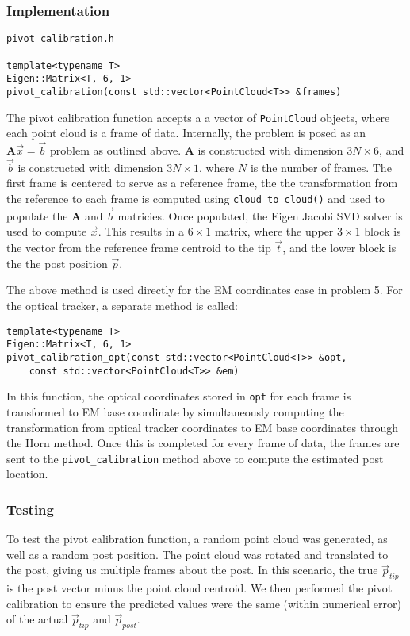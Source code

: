 \documentclass[letterpaper, 11pt]{report}
\newcommand{\mat}[1]{\mathbf{#1}}
\begin{document}
 \subsubsection{Implementation}
 \begin{verbatim}
pivot_calibration.h

template<typename T>
Eigen::Matrix<T, 6, 1>
pivot_calibration(const std::vector<PointCloud<T>> &frames)
 \end{verbatim}
 The pivot calibration function accepts a a vector of \texttt{PointCloud} objects, where each point cloud is a frame of data. Internally, the problem is posed as an $\mat{A}\vec x= \vec b$ problem as outlined above. $\mat A$ is constructed with dimension $3N \times 6$, and $\vec b$ is constructed with dimension $3N \times 1$, where $N$ is the number of frames. The first frame is centered to serve as a reference frame, the the transformation from the reference to each frame is computed using \texttt{cloud\_to\_cloud()} and used to populate the $\mat A$ and $\vec b$ matricies. Once populated, the Eigen Jacobi SVD solver is used to compute $\vec x$. This results in a $6 \times 1$ matrix, where the upper $3 \times 1$ block is the vector from the reference frame centroid to the tip $\vec t$, and the lower block is the the post position $\vec p$.
 
The above method is used directly for the EM coordinates case in problem 5. For the optical tracker, a separate method is called:
 \begin{verbatim}
template<typename T>
Eigen::Matrix<T, 6, 1>
pivot_calibration_opt(const std::vector<PointCloud<T>> &opt, 
    const std::vector<PointCloud<T>> &em) 
 \end{verbatim}
 In this function, the optical coordinates stored in \texttt{opt} for each frame is transformed to EM base coordinate by simultaneously computing the transformation from optical tracker coordinates to EM base coordinates through the Horn method. Once this is completed for every frame of data, the frames are sent to the \texttt{pivot\_calibration} method above to compute the estimated post location.
 
 \subsubsection{Testing}
To test the pivot calibration function, a random point cloud was generated, as well as a random post position. The point cloud was rotated and translated to the post, giving us multiple frames about the post. In this scenario, the true $\vec p_{tip}$ is the post vector minus the point cloud centroid. We then performed the pivot calibration to ensure the predicted values were the same (within numerical error) of the actual $\vec p_{tip}$ and $\vec p_{post}$.
\end{document}
